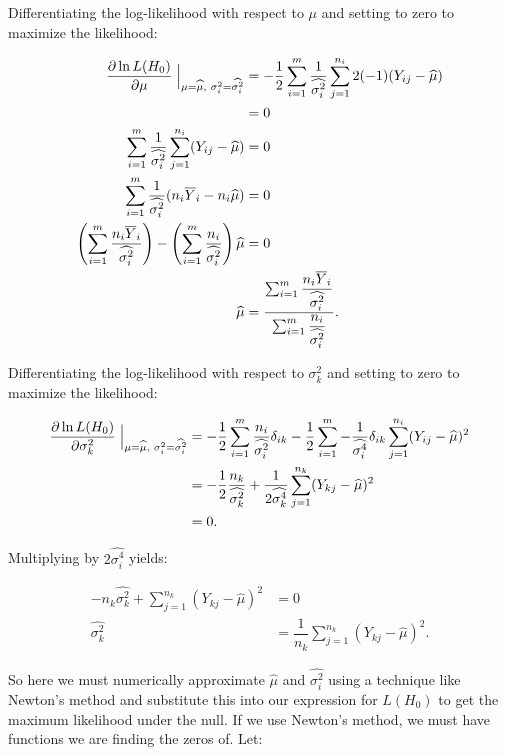 \documentclass[12pt,a4paper,openright]{article}
\newcommand{\ovY}{\overline{Y}}
\newcommand{\wmu}{\widehat{\mu}}
\begin{document}
	Differentiating the log-likelihood with respect to $\mu$ and setting to zero to maximize the likelihood:
	
	\begin{align}
		\dfrac{\partial \ln{L(H_0)}}{\partial \mu} \Bigm\lvert_{\mu = \wmu, \hspace{0.1cm}\sigma^2_i = \widehat{\sigma^2_i}} &= -\dfrac{1}{2} \sum_{i=1}^m \dfrac{1}{\widehat{\sigma^2_i}}\sum_{j=1}^{n_i} 2(-1)(Y_{ij}-\wmu) \nonumber\\
		&= 0 \nonumber\\
		\sum_{i=1}^m \dfrac{1}{\widehat{\sigma^2_i}}\sum_{j=1}^{n_i} (Y_{ij}-\wmu) &= 0 \nonumber\\
		\sum_{i=1}^m \dfrac{1}{\widehat{\sigma^2_i}} (n_i\ovY_i - n_i \wmu) &= 0 \nonumber\\
		\left(\sum_{i=1}^m \dfrac{n_i \ovY_i}{\widehat{\sigma^2_i}}\right) - \left(\sum_{i=1}^m \dfrac{n_i}{\widehat{\sigma^2_i}}\right)\wmu &= 0 \nonumber \\
		\wmu &= \dfrac{\sum_{i=1}^m \dfrac{n_i \ovY_i}{\widehat{\sigma^2_i}}}{\sum_{i=1}^m \dfrac{n_i}{\widehat{\sigma^2_i}}}. \label{wmuH0}
	\end{align}

	Differentiating the log-likelihood with respect to $\sigma^2_k$ and setting to zero to maximize the likelihood:
	
	\begin{align*}
		\dfrac{\partial \ln{L(H_0)}}{\partial \sigma^2_k} \Bigm\lvert_{\mu = \wmu, \hspace{0.1cm} \sigma^2_i = \widehat{\sigma^2_i}} &= -\dfrac{1}{2} \sum_{i=1}^m \dfrac{n_i}{\widehat{\sigma^2_i}}\delta_{ik} - \dfrac{1}{2} \sum_{i=1}^m -\dfrac{1}{\widehat{\sigma^4_i}} \delta_{ik}\sum_{j=1}^{n_i} (Y_{ij}-\wmu)^2 \\
		&= -\dfrac{1}{2} \dfrac{n_k}{\widehat{\sigma^2_k}} + \dfrac{1}{2\widehat{\sigma^4_k}} \sum_{j=1}^{n_k} (Y_{kj}-\wmu)^2 \\
		&= 0.
	\end{align*}

	Multiplying by $2\widehat{\sigma^4_i}$ yields:
	
	\begin{align}
		-n_k\widehat{\sigma^2_k} + \sum_{j=1}^{n_k} (Y_{kj}-\wmu)^2 &= 0 \nonumber\\
		\widehat{\sigma^2_k} &= \dfrac{1}{n_k} \sum_{j=1}^{n_k} (Y_{kj}-\wmu)^2. \label{wstH0}
	\end{align}

	So here we must numerically approximate $\wmu$ and $\widehat{\sigma^2_i}$ using a technique like Newton's method and substitute this into our expression for $L(H_0)$ to get the maximum likelihood under the null. If we use Newton's method, we must have functions we are finding the zeros of. Let:
	
\end{document}
